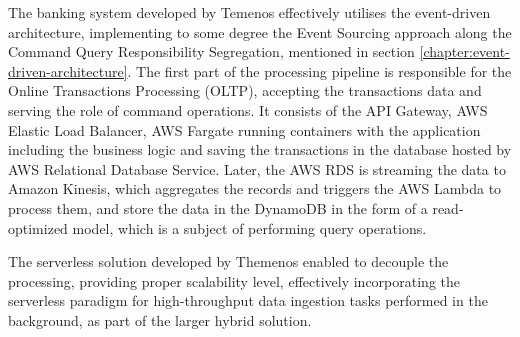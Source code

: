 The banking system developed by Temenos effectively utilises the event-driven architecture, implementing to some degree the Event Sourcing approach along the Command Query Responsibility Segregation, mentioned in section \ref{chapter:event-driven-architecture}.
The first part of the processing pipeline is responsible for the Online Transactions Processing (OLTP), accepting the transactions data and serving the role of command operations. It consists of the API Gateway, AWS Elastic Load Balancer, AWS Fargate running containers with the application including the business logic and saving the transactions in the database hosted by AWS Relational Database Service.
Later, the AWS RDS is streaming the data to Amazon Kinesis, which aggregates the records and triggers the AWS Lambda to process them, and store the data in the DynamoDB in the form of a read-optimized model, which is a subject of performing query operations.

The serverless solution developed by Themenos enabled to decouple the processing, providing proper scalability level, effectively incorporating the serverless paradigm for high-throughput data ingestion tasks performed in the background, as part of the larger hybrid solution.






